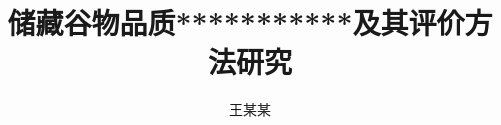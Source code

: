 \documentclass[doctor]{hautthesis}
\title{储藏谷物品质***********及其评价方法研究}
\author{王某某}
\begin{document}
\maketitle


\tableofcontents


\mainmatter









\hautappendix



\backmatter

\end{document}
